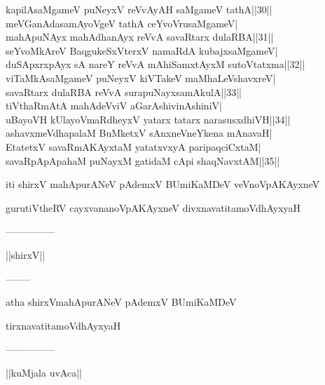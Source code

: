 \documentclass{article}
\begin{document}
kapilAsaMgameV puNeyxV reVvAyAH saMgameV tathA||30||\\
meVGanAdasamAyoVgeV tathA ceYvoVrusaMgameV|\\
mahApuNAyx mahAdhanAyx reVvA savaRtarx dulaRBA||31||\\
seYvoMkAreV BaqgukeSxVterxV namaRdA kubajxsaMgameV|\\
duSApxrxpAyx sA nareY reVvA mAhiSamxtAyxM sutoVtatxma||32||\\
viTaMkAsaMgameV puNeyxV kiVTakeV maMhaLeVshavxreV|\\
savaRtarx dulaRBA reVvA surapuNayxsamAkulA||33||\\
tiVthaRmAtA mahAdeVviV aGarAshivinAshiniV|\\
uBayoVH kUlayoVmaRdheyxV yatarx tatarx narasusxdhiVH||34||\\
ashavxmeVdhapalaM BuMketxV sAnxneVneYkena mAnavaH|\\
EtatetxV savaRmAKAyxtaM yatatxvxyA paripaqciCxtaM|\\
savaRpApApahaM puNayxM gatidaM cApi shaqNavxtAM||35||\\

\begin{center}
iti shirxV mahApurANeV pAdemxV BUmiKaMDeV veVnoVpAKAyxneV
\end{center}

\begin{center}
gurutiVtheRV cayxvananoVpAKAyxneV divxnavatitamoVdhAyxyaH
\end{center}

\begin{center}
---------------
\end{center}

\begin{center}
||shirxV||
\end{center}

\begin{center}
--------
\end{center}

\begin{center}
atha shirxVmahApurANeV pAdemxV BUmiKaMDeV
\end{center}

\begin{center}
tirxnavatitamoVdhAyxyaH
\end{center}

\begin{center}
---------------
\end{center}

\begin{center}
||kuMjala uvAca||
\end{center}
\end{document}

